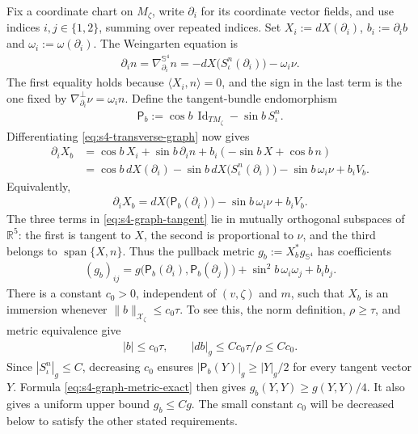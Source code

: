 \documentclass[a4paper,11pt,oneside,reqno]{amsart}
\numberwithin{equation}{section}
\theoremstyle{definition}
\begin{document}
Fix a coordinate chart on $M_\zeta$, write $\partial_i$
for its coordinate vector fields, and use indices
$i,j\in\{1,2\}$, summing over repeated indices. Set
$X_i:=dX(\partial_i)$, $b_i:=\partial_i b$ and
$\omega_i:=\omega(\partial_i)$. The Weingarten equation is
%
\begin{align*}
    \partial_i n
    =\nabla^{\mathbb S^4}_{\partial_i}n
    =-dX\bigl(S_\iota^n(\partial_i)\bigr)-\omega_i\nu.
\end{align*}
%
The first equality holds because $\langle X_i,n\rangle=0$,
and the sign in the last term is the one fixed by
$\nabla^\perp_{\partial_i}\nu=\omega_i n$.
Define the tangent-bundle endomorphism
%
\begin{align*}
    \mathsf P_b:=\cos b\,\operatorname{Id}_{TM_\zeta}
                      -\sin b\,S_\iota^n.
\end{align*}
%
Differentiating \eqref{eq:s4-transverse-graph} now gives
%
\begin{align*}
    \partial_iX_b
    &=\cos b\,X_i+\sin b\,\partial_i n
                         +b_i(-\sin b\,X+\cos b\,n)\\
    &=\cos b\,dX(\partial_i)
       -\sin b\,dX\bigl(S_\iota^n(\partial_i)\bigr)
       -\sin b\,\omega_i\nu+b_iV_b.
\end{align*}
%
Equivalently,
%
\begin{align}
    \label{eq:s4-graph-tangent}
    \partial_iX_b
    =dX\bigl(\mathsf P_b(\partial_i)\bigr)
    -\sin b\,\omega_i\nu+b_iV_b.
\end{align}
%
The three terms in \eqref{eq:s4-graph-tangent} lie in
mutually orthogonal subspaces of $\mathbb R^5$: the first
is tangent to $X$, the second is proportional to $\nu$,
and the third belongs to $\operatorname{span}\{X,n\}$.
Thus the pullback metric $g_b:=X_b^*g_{\mathbb S^4}$ has
coefficients
%
\begin{align}
    \label{eq:s4-graph-metric-exact}
    (g_b)_{ij}
    =g\bigl(\mathsf P_b(\partial_i),\mathsf P_b(\partial_j)\bigr)
    +\sin^2b\,\omega_i\omega_j+b_ib_j.
\end{align}
%
There is a constant $c_0>0$, independent of $(v,\zeta)$
and $m$, such that $X_b$ is an immersion whenever
$\|b\|_{\mathcal X_\zeta}\leq c_0\tau$. To see this, the
norm definition, $\rho\geq\tau$, and metric equivalence give
%
\begin{align*}
    |b|\leq c_0\tau,\qquad
    |db|_g\leq Cc_0\tau/\rho\leq Cc_0.
\end{align*}
%
Since $|S_\iota^n|_g\leq C$, decreasing $c_0$ ensures
$|\mathsf P_b(Y)|_g\geq |Y|_g/2$ for every tangent
vector $Y$. Formula \eqref{eq:s4-graph-metric-exact} then
gives $g_b(Y,Y)\geq g(Y,Y)/4$. It also gives a uniform
upper bound $g_b\leq Cg$. The small constant $c_0$ will be
decreased below to satisfy the other stated requirements.
\end{document}
